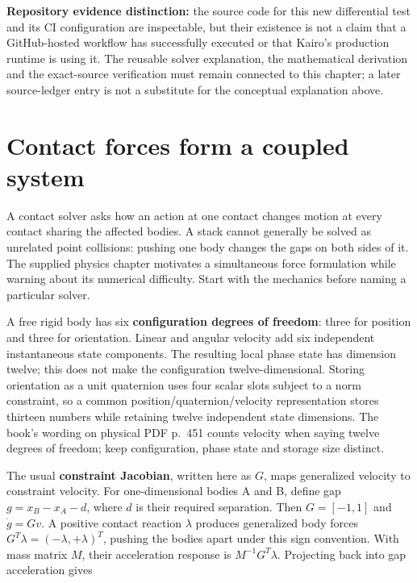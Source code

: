 \textbf{Repository evidence distinction:} the source code for this new differential test and its CI configuration are inspectable, but their existence is not a claim that a GitHub-hosted workflow has successfully executed or that Kairo's production runtime is using it. The reusable solver explanation, the mathematical derivation and the exact-source verification must remain connected to this chapter; a later source-ledger entry is not a substitute for the conceptual explanation above.

\section{Contact forces form a coupled system}\label{06-engine-ii-ch046-contact-forces-form-a-coupled-system}

A contact solver asks how an action at one contact changes motion at every contact sharing the affected bodies. A stack cannot generally be solved as unrelated point collisions: pushing one body changes the gaps on both sides of it. The supplied physics chapter motivates a simultaneous force formulation while warning about its numerical difficulty. Start with the mechanics before naming a particular solver.

A free rigid body has six \textbf{configuration degrees of freedom}: three for position and three for orientation. Linear and angular velocity add six independent instantaneous state components. The resulting local phase state has dimension twelve; this does not make the configuration twelve-dimensional. Storing orientation as a unit quaternion uses four scalar slots subject to a norm constraint, so a common position/quaternion/velocity representation stores thirteen numbers while retaining twelve independent state dimensions. The book's wording on physical PDF p.~451 counts velocity when saying twelve degrees of freedom; keep configuration, phase state and storage size distinct.

The usual \textbf{constraint Jacobian}, written here as \(G\), maps generalized velocity to constraint velocity. For one-dimensional bodies A and B, define gap \(g=x_B-x_A-d\), where \(d\) is their required separation. Then \(G=[-1,1]\) and \(\dot g=Gv\). A positive contact reaction \(\lambda\) produces generalized body forces \(G^T\lambda=(-\lambda,+\lambda)^T\), pushing the bodies apart under this sign convention. With mass matrix \(M\), their acceleration response is \(M^{-1}G^T\lambda\). Projecting back into gap acceleration gives

